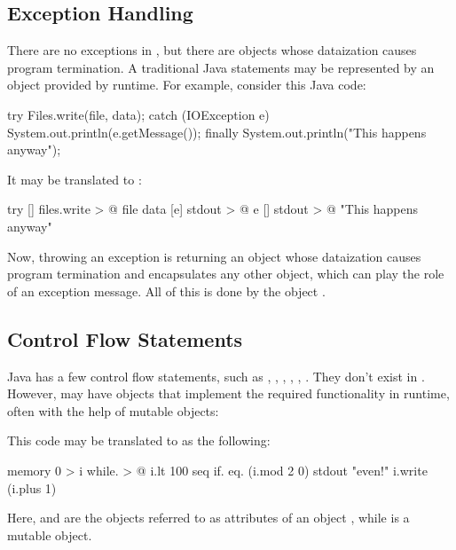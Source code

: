\subsection{Exception Handling}

There are no exceptions in \eo{}, but there are objects whose dataization causes program termination.
A traditional Java  statements
may be represented by an object  provided by \eo{} runtime.
For example, consider this Java code:

\begin{ffcode}
try {
  Files.write(file, data);
} catch (IOException e) {
  System.out.println(e.getMessage());
} finally {
  System.out.println("This happens anyway");
}
\end{ffcode}

It may be translated to \eo{}:

\begin{twocols}
\begin{ffcode}
try
  []
    files.write > @
      file
      data
  [e]
    stdout > @
      e
  []
    stdout > @
      "This happens anyway"
\end{ffcode}
\end{twocols}

Now, throwing an exception is returning an object whose dataization causes program termination
and encapsulates any other object, which can play the role of an exception message. All of this is done
by the object .

\subsection{Control Flow Statements}

Java has a few control flow statements, such as
, , , , , .
They don't exist in \eo{}. However, \eo{} may have objects
that implement the required functionality in runtime, often with the
help of mutable objects:


This code may be translated to \eo{} as the following:

\begin{ffcode}
[]
  memory 0 > i
  while. > @
    i.lt 100
    seq
      if.
        eq. (i.mod 2 0)
        stdout "even!"
      i.write (i.plus 1)
\end{ffcode}

Here,  and  are the objects referred to as attributes of an object
, while  is a mutable object.
